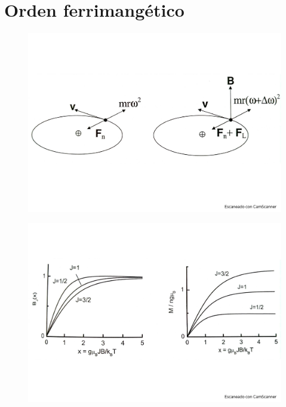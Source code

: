\section{Orden ferrimangético}
\begin{figure}[h!] \centering
	\includegraphics[scale=0.5]{Cuerpo/Ch_10/Fotos libro 1.pdf}
	\caption{}
	\label{Fig:10-01}
\end{figure}
\begin{figure}[h!] \centering
	\includegraphics[scale=0.5]{Cuerpo/Ch_10/Fotos libro 2.pdf}
	\caption{}
	\label{Fig:10-02}
\end{figure}
